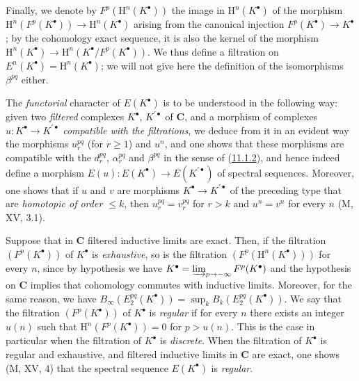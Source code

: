 \begin{env}[11.2.2]
Finally, we denote by $F^p(\mathrm H^n(K^\bullet))$ the image in
$\mathrm H^n(K^\bullet)$ of the morphism
$\mathrm H^n(F^p(K^\bullet))\to\mathrm H^n(K^\bullet)$ arising from
the canonical injection $F^p(K^\bullet)\to K^\bullet$; by the cohomology exact
sequence, it is also the kernel of the morphism
$\mathrm H^n(K^\bullet)\to\mathrm H^n(K^\bullet/F^p(K^\bullet))$. We
thus define a filtration on
$E^n(K^\bullet)=\mathrm H^n(K^\bullet)$; we will not give here
the definition of the isomorphisms $\beta^{pq}$ either.
\end{env}

\begin{env}[11.2.3]
\label{0.11.2.3}
The \emph{functorial} character of $E(K^\bullet)$ is to be understood in the
following way: given two \emph{filtered} complexes $K^\bullet$,
$K^{\prime\bullet}$ of $\boldsymbol{C}$, and a morphism of complexes
$u:K^\bullet\to K^{\prime\bullet}$ \emph{compatible with the filtrations}, we
deduce from it in an evident way the morphisms $u_r^{pq}$ (for $r\geq1$) and
$u^n$, and one shows that these morphisms are compatible with the $d_r^{pq}$,
$\alpha_r^{pq}$ and $\beta^{pq}$ in the sense of
(\hyperref[0.11.1.2]{11.1.2}), and hence indeed define a morphism
$E(u):E(K^\bullet)\to E(K^{\prime\bullet})$ of spectral sequences. Moreover,
one shows that if $u$ and $v$ are morphisms
$K^\bullet\to K^{\prime\bullet}$ of the preceding type that are \emph{homotopic of order
$\leq k$}, then $u_r^{pq}=v_r^{pq}$ for $r>k$ and $u^n=v^n$ for every $n$
(M, XV, 3.1).
\end{env}

\begin{env}[11.2.4]
\label{0.11.2.4}
Suppose that in $\boldsymbol{C}$ filtered inductive limits are
exact. Then, if the filtration $(F^p(K^\bullet))$ of $K^\bullet$ is
\emph{exhaustive}, so is the filtration
$(F^p(\mathrm H^n(K^\bullet)))$ for every $n$, since by hypothesis we have
$K^\bullet=\varinjlim_{p\to-\infty}F^p(K^\bullet)$ and the hypothesis on
$\boldsymbol{C}$ implies that cohomology commutes with inductive limits.
Moreover, for the same reason, we have
$B_\infty(E_2^{pq}(K^\bullet))=\sup_k B_k(E_2^{pq}(K^\bullet))$. We say that
the filtration $(F^p(K^\bullet))$ of $K^\bullet$ is \emph{regular} if for
every $n$ there exists an integer $u(n)$ such that
$\mathrm H^n(F^p(K^\bullet))=0$ for $p>u(n)$. This is the case in particular
when the filtration of $K^\bullet$ is \emph{discrete}. When the
filtration of $K^\bullet$ is regular and exhaustive, and filtered inductive
limits in $\boldsymbol{C}$ are exact, one shows (M, XV, 4)
that the spectral sequence $E(K^\bullet)$ is \emph{regular}.
\end{env}


